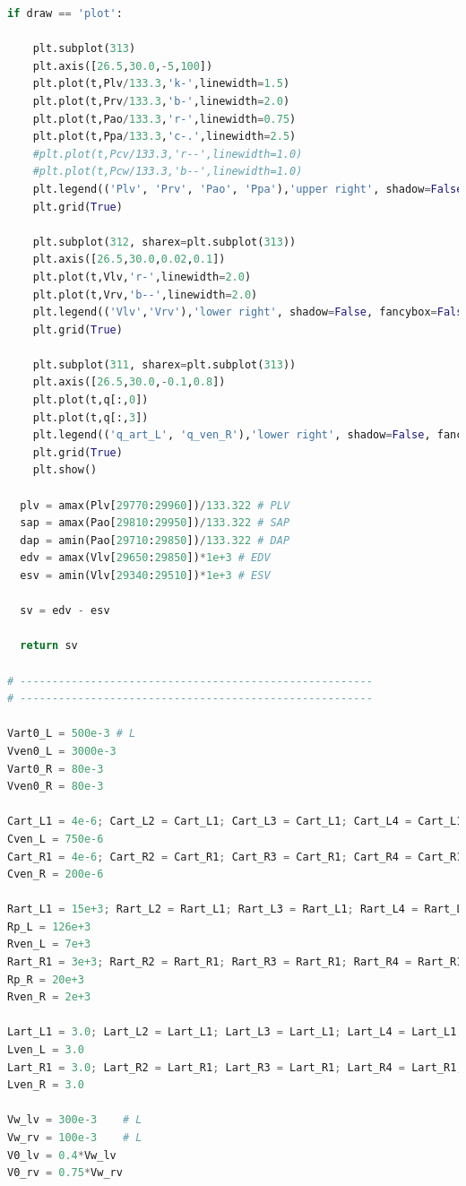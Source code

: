 \begin{lstlisting}[language=Python,caption={Математическая модель сердечно-сосудистой системы на языке программирования Python},label={list:cardiovascular_system_model}]
  if draw == 'plot':

    plt.subplot(313)
    plt.axis([26.5,30.0,-5,100])
    plt.plot(t,Plv/133.3,'k-',linewidth=1.5)
    plt.plot(t,Prv/133.3,'b-',linewidth=2.0)
    plt.plot(t,Pao/133.3,'r-',linewidth=0.75)
    plt.plot(t,Ppa/133.3,'c-.',linewidth=2.5)
    #plt.plot(t,Pcv/133.3,'r--',linewidth=1.0)
    #plt.plot(t,Pcw/133.3,'b--',linewidth=1.0)
    plt.legend(('Plv', 'Prv', 'Pao', 'Ppa'),'upper right', shadow=False, fancybox=False)
    plt.grid(True)

    plt.subplot(312, sharex=plt.subplot(313))
    plt.axis([26.5,30.0,0.02,0.1])
    plt.plot(t,Vlv,'r-',linewidth=2.0)
    plt.plot(t,Vrv,'b--',linewidth=2.0)
    plt.legend(('Vlv','Vrv'),'lower right', shadow=False, fancybox=False)
    plt.grid(True)
    
    plt.subplot(311, sharex=plt.subplot(313))
    plt.axis([26.5,30.0,-0.1,0.8])
    plt.plot(t,q[:,0])
    plt.plot(t,q[:,3])
    plt.legend(('q_art_L', 'q_ven_R'),'lower right', shadow=False, fancybox=False)
    plt.grid(True)
    plt.show()

  plv = amax(Plv[29770:29960])/133.322 # PLV
  sap = amax(Pao[29810:29950])/133.322 # SAP
  dap = amin(Pao[29710:29850])/133.322 # DAP
  edv = amax(Vlv[29650:29850])*1e+3 # EDV
  esv = amin(Vlv[29340:29510])*1e+3 # ESV

  sv = edv - esv

  return sv

# -------------------------------------------------------
# -------------------------------------------------------

Vart0_L = 500e-3 # L
Vven0_L = 3000e-3
Vart0_R = 80e-3
Vven0_R = 80e-3 

Cart_L1 = 4e-6; Cart_L2 = Cart_L1; Cart_L3 = Cart_L1; Cart_L4 = Cart_L1; Cart_L5 = Cart_L1 # L/Pa
Cven_L = 750e-6 
Cart_R1 = 4e-6; Cart_R2 = Cart_R1; Cart_R3 = Cart_R1; Cart_R4 = Cart_R1; Cart_R5 = Cart_R1
Cven_R = 200e-6

Rart_L1 = 15e+3; Rart_L2 = Rart_L1; Rart_L3 = Rart_L1; Rart_L4 = Rart_L1; Rart_L5 = Rart_L1 # Pa s/L
Rp_L = 126e+3   
Rven_L = 7e+3 
Rart_R1 = 3e+3; Rart_R2 = Rart_R1; Rart_R3 = Rart_R1; Rart_R4 = Rart_R1; Rart_R5 = Rart_R1
Rp_R = 20e+3    
Rven_R = 2e+3

Lart_L1 = 3.0; Lart_L2 = Lart_L1; Lart_L3 = Lart_L1; Lart_L4 = Lart_L1; Lart_L5 = Lart_L1 # Pa s^2/L
Lven_L = 3.0
Lart_R1 = 3.0; Lart_R2 = Lart_R1; Lart_R3 = Lart_R1; Lart_R4 = Lart_R1; Lart_R5 = Lart_R1
Lven_R = 3.0

Vw_lv = 300e-3    # L
Vw_rv = 100e-3    # L
V0_lv = 0.4*Vw_lv
V0_rv = 0.75*Vw_rv


\end{lstlisting}
